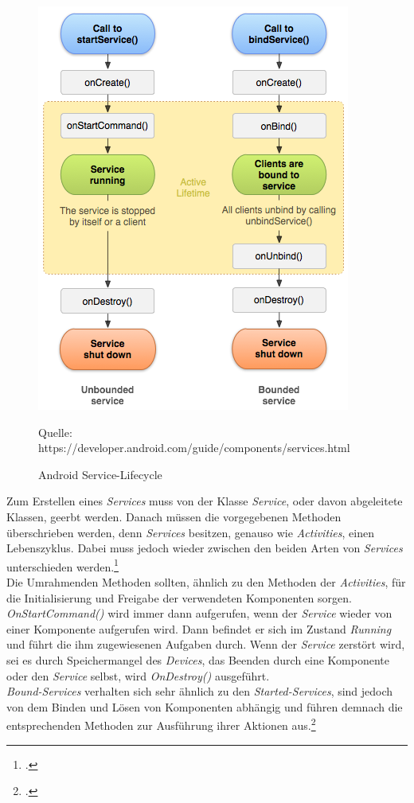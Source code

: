 \begin{figure}[!h]
\centering
\includegraphics[width=0.5\linewidth]{content/images/Android-ServiceLifecycle}
\caption{Android Service-Lifecycle}
Quelle: https://developer.android.com/guide/components/services.html
\label{pic:androidServiceLifecycle}
\end{figure}

Zum Erstellen eines \textit{Services} muss von der Klasse \textit{Service}, oder davon abgeleitete Klassen, geerbt werden. Danach müssen die vorgegebenen Methoden überschrieben werden, denn \textit{Services} besitzen, genauso wie \textit{Activities}, einen Lebenszyklus. Dabei muss jedoch wieder zwischen den beiden Arten von \textit{Services} unterschieden werden.\footcite[S. 168f.]{Android-BeckerPant}\\
Die Umrahmenden Methoden sollten, ähnlich zu den Methoden der \textit{Activities}, für die Initialisierung und Freigabe der verwendeten Komponenten sorgen. \textit{OnStartCommand()} wird immer dann aufgerufen, wenn der \textit{Service} wieder von einer Komponente aufgerufen wird. Dann befindet er sich im Zustand \textit{Running} und führt die ihm zugewiesenen Aufgaben durch. Wenn der \textit{Service} zerstört wird, sei es durch Speichermangel des \textit{Devices}, das Beenden durch eine Komponente oder den \textit{Service} selbst, wird \textit{OnDestroy()} ausgeführt.\\
\textit{Bound-Services} verhalten sich sehr ähnlich zu den \textit{Started-Services}, sind jedoch von dem Binden und Lösen von Komponenten abhängig und führen demnach die entsprechenden Methoden zur Ausführung ihrer Aktionen aus.\footcite{Android-Services}
